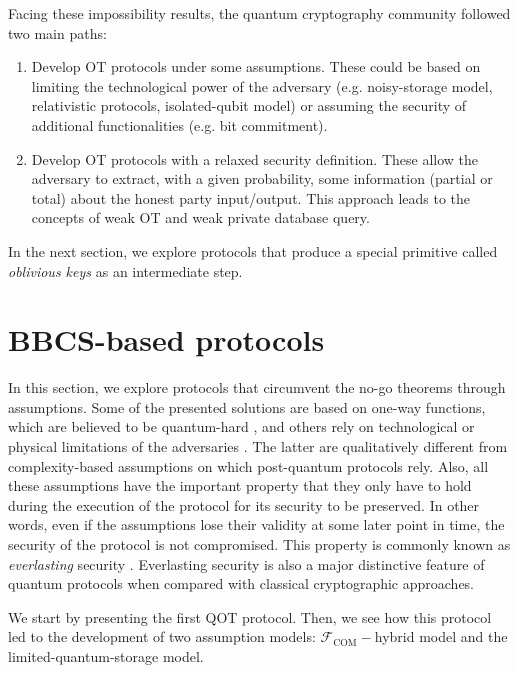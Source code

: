 Facing these impossibility results, the quantum cryptography community followed two main paths:

\begin{enumerate}
    \item Develop OT protocols under some assumptions. These could be based on limiting the technological power of the adversary (e.g. noisy-storage model, relativistic protocols, isolated-qubit model) or assuming the security of additional functionalities (e.g. bit commitment).
    \item Develop OT protocols with a relaxed security definition. These allow the adversary to extract, with a given probability, some information (partial or total) about the honest party input/output. This approach leads to the concepts of weak OT  and weak private database query.
\end{enumerate}

In the next section, we explore protocols that produce a special primitive called \textit{oblivious keys} as an intermediate step.


\section{BBCS-based protocols}

In this section, we explore protocols that circumvent the no-go theorems \cite{LC97, M97} through assumptions. Some of the presented solutions are based on one-way functions, which are believed to be quantum-hard \cite{BCKM21, GLSV21,A02}, and others rely on technological or physical limitations of the adversaries \cite{DFSS05, WST08, KWW12, L14, Pit16, Ken11}. The latter are qualitatively different from complexity-based assumptions on which post-quantum protocols rely. Also, all these assumptions have the important property that they only have to hold during the execution of the protocol for its security to be preserved. In other words, even if the assumptions lose their validity at some later point in time, the security of the protocol is not compromised. This property is commonly known as \textit{everlasting} security \cite{U18}. Everlasting security is also a major distinctive feature of quantum protocols when compared with classical cryptographic approaches.

We start by presenting the first QOT protocol. Then, we see how this protocol led to the development of two assumption models: $\mathcal{F}_{\text{COM}}-$hybrid model and the limited-quantum-storage model. 

